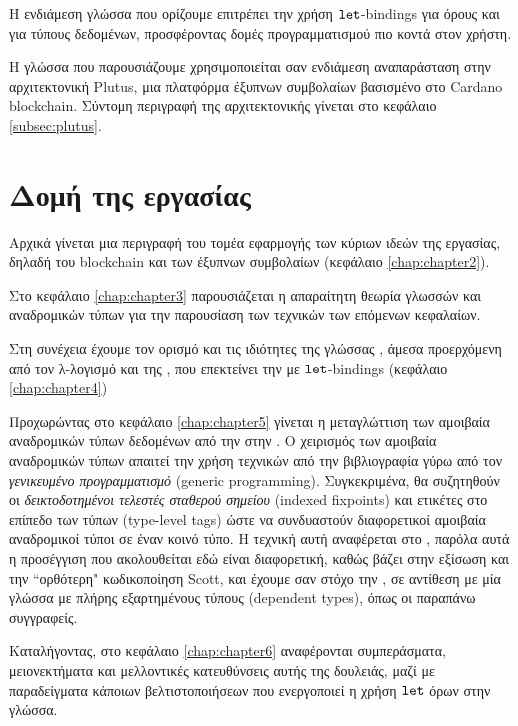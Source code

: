 Η ενδιάμεση γλώσσα που ορίζουμε επιτρέπει την χρήση $\operatorname{\texttt{let}}$-bindings για
όρους και για τύπους δεδομένων, προσφέροντας δομές προγραμματισμού πιο κοντά
στον χρήστη.

Η γλώσσα που παρουσιάζουμε χρησιμοποιείται σαν ενδιάμεση αναπαράσταση στην
αρχιτεκτονική Plutus, μια πλατφόρμα έξυπνων συμβολαίων βασισμένο στο Cardano
blockchain. Σύντομη περιγραφή της αρχιτεκτονικής γίνεται στο κεφάλαιο
\ref{subsec:plutus}.

\section{Δομή της εργασίας}

Αρχικά γίνεται μια περιγραφή του τομέα εφαρμογής των κύριων ιδεών της
εργασίας, δηλαδή του blockchain και των έξυπνων συμβολαίων (κεφάλαιο
\ref{chap:chapter2}).

Στο κεφάλαιο \ref{chap:chapter3}  παρουσιάζεται η απαραίτητη θεωρία
γλωσσών και αναδρομικών τύπων για την παρουσίαση των τεχνικών των επόμενων
κεφαλαίων.

Στη συνέχεια έχουμε τον ορισμό και τις ιδιότητες της γλώσσας \FOMF{},
άμεσα προερχόμενη από τον λ-λογισμό και της \FIR{}, που επεκτείνει την
\FOMF{} με $\operatorname{\texttt{let}}$-bindings (κεφάλαιο \ref{chap:chapter4})

Προχωρώντας στο κεφάλαιο \ref{chap:chapter5} γίνεται η μεταγλώττιση των
αμοιβαία αναδρομικών τύπων δεδομένων από την \FIR{} στην \FOMF{}. Ο
χειρισμός των αμοιβαία αναδρομικών τύπων απαιτεί την χρήση τεχνικών από
την βιβλιογραφία γύρω από τον \emph{γενικευμένο προγραμματισμό}
(generic programming). Συγκεκριμένα, θα  συζητηθούν οι
\emph{δεικτοδοτημένοι τελεστές σταθερού σημείου} (indexed fixpoints)
και ετικέτες στο επίπεδο των τύπων (type-level tags) ώστε να
συνδυαστούν διαφορετικοί αμοιβαία αναδρομικοί τύποι σε έναν κοινό τύπο.
Η τεχνική αυτή αναφέρεται στο \cite{fixmutualgeneric}, παρόλα αυτά η
προσέγγιση που ακολουθείται εδώ είναι διαφορετική, καθώς βάζει στην
εξίσωση και την ``ορθότερη" κωδικοποίηση Scott, και έχουμε σαν στόχο
την \FOMF{}, σε αντίθεση με μία γλώσσα με πλήρης εξαρτημένους τύπους
(dependent types), όπως οι παραπάνω συγγραφείς.

Καταλήγοντας,  στο κεφάλαιο \ref{chap:chapter6} αναφέρονται
συμπεράσματα, μειονεκτήματα και μελλοντικές κατευθύνσεις αυτής της
δουλειάς, μαζί με παραδείγματα κάποιων βελτιστοποιήσεων που ενεργοποιεί
η χρήση $\operatorname{\texttt{let}}$ όρων στην γλώσσα.

